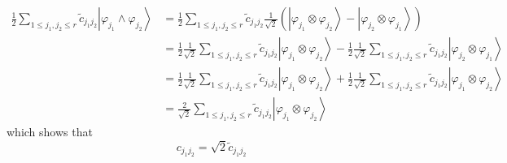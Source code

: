 \documentclass[aps,preprint]{revtex4}%
\begin{document}
\begin{align}
\frac{1}{2}\sum_{1\leq j_{1},j_{2}\leq r}\tilde{c}_{j_{1}j_{2}}\left\vert
\varphi_{j_{1}}\wedge\varphi_{j_{2}}\right\rangle  &  =\frac{1}{2}\sum_{1\leq
j_{1},j_{2}\leq r}\tilde{c}_{j_{1}j_{2}}\frac{1}{\sqrt{2}}\left(  \left\vert
\varphi_{j_{1}}\otimes\varphi_{j_{2}}\right\rangle -\left\vert \varphi_{j_{2}%
}\otimes\varphi_{j_{1}}\right\rangle \right) \nonumber\\
&  =\frac{1}{2}\frac{1}{\sqrt{2}}\sum_{1\leq j_{1},j_{2}\leq r}\tilde
{c}_{j_{1}j_{2}}\left\vert \varphi_{j_{1}}\otimes\varphi_{j_{2}}\right\rangle
-\frac{1}{2}\frac{1}{\sqrt{2}}\sum_{1\leq j_{1},j_{2}\leq r}\tilde{c}%
_{j_{1}j_{2}}\left\vert \varphi_{j_{2}}\otimes\varphi_{j_{1}}\right\rangle
\nonumber\\
&  =\frac{1}{2}\frac{1}{\sqrt{2}}\sum_{1\leq j_{1},j_{2}\leq r}\tilde
{c}_{j_{1}j_{2}}\left\vert \varphi_{j_{1}}\otimes\varphi_{j_{2}}\right\rangle
+\frac{1}{2}\frac{1}{\sqrt{2}}\sum_{1\leq j_{1},j_{2}\leq r}\tilde{c}%
_{j_{1}j_{2}}\left\vert \varphi_{j_{1}}\otimes\varphi_{j_{2}}\right\rangle
\nonumber\\
&  =\frac{2}{\sqrt{2}}\sum_{1\leq j_{1},j_{2}\leq r}\tilde{c}_{j_{1}j_{2}%
}\left\vert \varphi_{j_{1}}\otimes\varphi_{j_{2}}\right\rangle
\end{align}
which shows that
\begin{equation}
c_{j_{1}j_{2}}=\sqrt{2}\tilde{c}_{j_{1}j_{2}}%
\end{equation}
\end{document}
